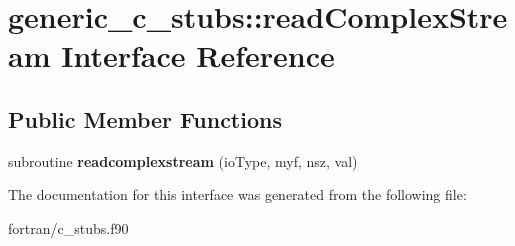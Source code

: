 \hypertarget{interfacegeneric__c__stubs_1_1read_complex_stream}{}\section{generic\+\_\+c\+\_\+stubs\+:\+:read\+Complex\+Stream Interface Reference}
\label{interfacegeneric__c__stubs_1_1read_complex_stream}
\subsection*{Public Member Functions}
\begin{DoxyCompactItemize}
\item 
\mbox{\label{interfacegeneric__c__stubs_1_1read_complex_stream_a8cbcaa45cf58eb84dcd32aa8d104d20e}} 
subroutine {\bfseries readcomplexstream} (io\+Type, myf, nsz, val)
\end{DoxyCompactItemize}


The documentation for this interface was generated from the following file\+:\begin{DoxyCompactItemize}
\item 
fortran/c\+\_\+stubs.\+f90\end{DoxyCompactItemize}
